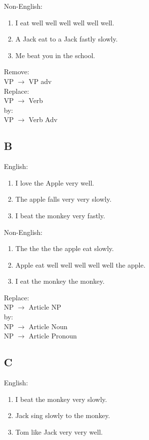 \documentclass[paper=a4, fontsize=11pt]{scrartcl} %
\begin{document}
Non-English:
\begin{enumerate}
\item I eat well well well well well well.
\item A Jack eat to a Jack fastly slowly.
\item Me beat you in the school.
\end{enumerate}

Remove:\\
VP $\rightarrow$ VP adv\\
Replace:\\
VP $\rightarrow$ Verb\\
by:\\
VP $\rightarrow$ Verb Adv

\subsection{B}

English:
\begin{enumerate}
\item I love the Apple very well.
\item The apple falls very very slowly.
\item I beat the monkey very fastly.
\end{enumerate}

Non-English:
\begin{enumerate}
\item The the the the apple eat slowly.
\item Apple eat well well well well well the apple.
\item I eat the monkey the monkey.
\end{enumerate}

Replace:\\
NP $\rightarrow$ Article NP\\
by:\\
NP $\rightarrow$ Article Noun\\
NP $\rightarrow$ Article Pronoun

\subsection{C}

English:
\begin{enumerate}
\item I beat the monkey very slowly.
\item Jack sing slowly to the monkey.
\item Tom like Jack very very well.
\end{enumerate}
\end{document}
